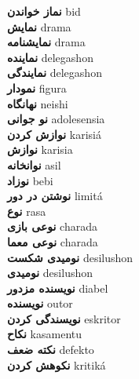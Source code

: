 \textbf{ نماز خواندن  } bid \\
\textbf{ نمایش  } drama \\
\textbf{ نمایشنامه  } drama \\
\textbf{ نماینده  } delegashon \\
\textbf{ نمایندگی  } delegashon \\
\textbf{ نمودار  } figura \\
\textbf{ نهانگاه  } neishi \\
\textbf{ نو جوانی  } adolesensia \\
\textbf{ نوازش کردن  } karisiá \\
\textbf{ نوازش  } karisia \\
\textbf{ نوانخانه  } asil \\
\textbf{ نوزاد  } bebi \\
\textbf{ نوشتن در دور  } limitá \\
\textbf{ نوع  } rasa \\
\textbf{ نوعی بازی  } charada \\
\textbf{ نوعی معما  } charada \\
\textbf{ نومیدی شکست  } desilushon \\
\textbf{ نومیدی  } desilushon \\
\textbf{ نویسنده مزدور  } diabel \\
\textbf{ نویسنده  } outor \\
\textbf{ نویسندگی کردن  } eskritor \\
\textbf{ نکاح  } kasamentu \\
\textbf{ نکته ضعف  } defekto \\
\textbf{ نکوهش کردن  } kritiká \\
